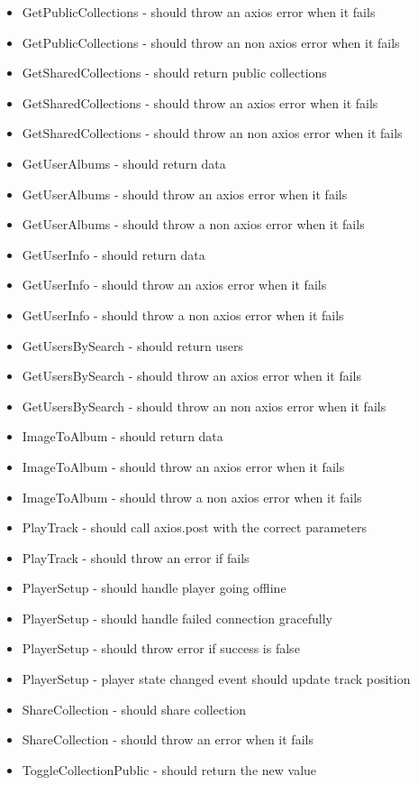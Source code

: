 \begin{multicols}{1}
\begin{itemize}
\item GetPublicCollections - should throw an axios error when it fails
\item GetPublicCollections - should throw an non axios error when it fails
\item GetSharedCollections - should return public collections
\item GetSharedCollections - should throw an axios error when it fails
\item GetSharedCollections - should throw an non axios error when it fails
\item GetUserAlbums - should return data
\item GetUserAlbums - should throw an axios error when it fails
\item GetUserAlbums - should throw a non axios error when it fails
\item GetUserInfo - should return data
\item GetUserInfo - should throw an axios error when it fails
\item GetUserInfo - should throw a non axios error when it fails
\item GetUsersBySearch - should return users
\item GetUsersBySearch - should throw an axios error when it fails
\item GetUsersBySearch - should throw an non axios error when it fails
\item ImageToAlbum - should return data
\item ImageToAlbum - should throw an axios error when it fails
\item ImageToAlbum - should throw a non axios error when it fails
\item PlayTrack - should call axios.post with the correct parameters
\item PlayTrack - should throw an error if fails
\item PlayerSetup - should handle player going offline
\item PlayerSetup - should handle failed connection gracefully
\item PlayerSetup - should throw error if success is false
\item PlayerSetup - player state changed event should update track position
\item ShareCollection - should share collection
\item ShareCollection - should throw an error when it fails
\item ToggleCollectionPublic - should return the new value

\end{itemize}
\end{multicols}
